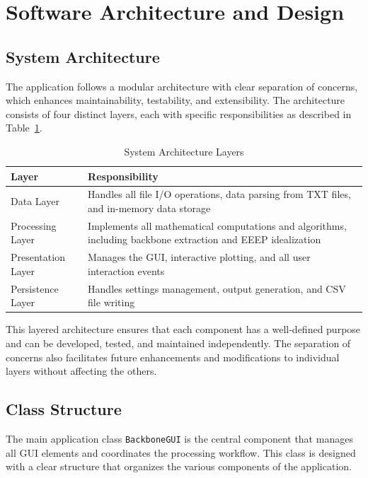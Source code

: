 \documentclass[11pt,a4paper]{article}
\begin{document}
\section{Software Architecture and Design}

\subsection{System Architecture}

The application follows a modular architecture with clear separation of concerns, which enhances maintainability, testability, and extensibility. The architecture consists of four distinct layers, each with specific responsibilities as described in Table~\ref{tab:architecture_layers}.

\begin{table}[h]
\centering
\caption{System Architecture Layers}\label{tab:architecture_layers}
\begin{tabular}{p{4cm}p{10cm}}
\toprule
\textbf{Layer} & \textbf{Responsibility} \\
\midrule
Data Layer & Handles all file I/O operations, data parsing from TXT files, and in-memory data storage \\
Processing Layer & Implements all mathematical computations and algorithms, including backbone extraction and EEEP idealization \\
Presentation Layer & Manages the GUI, interactive plotting, and all user interaction events \\
Persistence Layer & Handles settings management, output generation, and CSV file writing \\
\bottomrule
\end{tabular}
\end{table}

This layered architecture ensures that each component has a well-defined purpose and can be developed, tested, and maintained independently. The separation of concerns also facilitates future enhancements and modifications to individual layers without affecting the others.

\subsection{Class Structure}

The main application class \texttt{BackboneGUI} is the central component that manages all GUI elements and coordinates the processing workflow. This class is designed with a clear structure that organizes the various components of the application.
\end{document}
